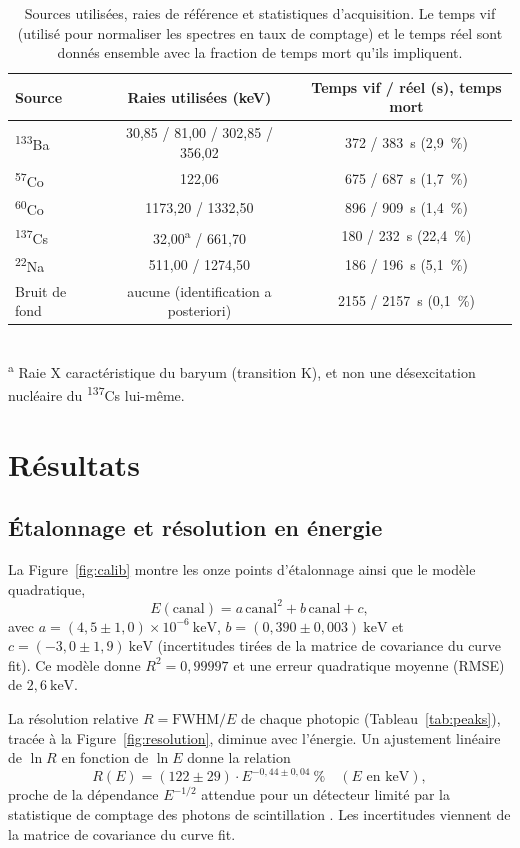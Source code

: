 \documentclass[11pt,letterpaper]{article}
\newcommand{\beq}[1]{\begin{equation} \label{#1}}
\def\enq{\end{equation}}
\begin{document}
\begin{table}[htbp]
\centering
\caption{Sources utilisées, raies de référence et statistiques d'acquisition. Le temps vif (utilisé pour normaliser les spectres en taux de comptage) et le temps réel sont donnés ensemble avec la fraction de temps mort qu'ils impliquent.}
\label{tab:acquisitions}
\small
\begin{tabular}{lcc}
\hline
Source & Raies utilisées (keV) & Temps vif / réel (s), temps mort \\
\hline
\textsuperscript{133}Ba & 30,85 / 81,00 / 302,85 / 356,02 & 372 / 383~s (2,9~\%) \\
\textsuperscript{57}Co  & 122,06 & 675 / 687~s (1,7~\%) \\
\textsuperscript{60}Co  & 1173,20 / 1332,50 & 896 / 909~s (1,4~\%) \\
\textsuperscript{137}Cs & 32,00\textsuperscript{a} / 661,70 & 180 / 232~s (22,4~\%) \\
\textsuperscript{22}Na  & 511,00 / 1274,50 & 186 / 196~s (5,1~\%) \\
Bruit de fond & aucune (identification a posteriori) & 2155 / 2157~s (0,1~\%) \\
\hline
\end{tabular}
\\[0.3em]
{\footnotesize \textsuperscript{a} Raie X caractéristique du baryum (transition K), et non une désexcitation nucléaire du \textsuperscript{137}Cs lui-même.}
\end{table}

\section{Résultats}
\label{sec:resultats}

\subsection{Étalonnage et résolution en énergie}

La Figure~\ref{fig:calib} montre les onze points d'étalonnage ainsi que le modèle quadratique,
\beq{eq:calib}
    E(\text{canal}) = a\,\text{canal}^2 + b\,\text{canal} + c ,
\enq
avec $a = (4{,}5 \pm 1{,}0) \times 10^{-6}~\text{keV}$, $b = (0{,}390 \pm 0{,}003)~\text{keV}$ et $c = (-3{,}0 \pm 1{,}9)~\text{keV}$ (incertitudes tirées de la matrice de covariance du curve fit). Ce modèle donne $R^2 = 0{,}99997$ et une erreur quadratique moyenne (RMSE) de $2{,}6~\text{keV}$.

La résolution relative $R = \text{FWHM}/E$ de chaque photopic (Tableau~\ref{tab:peaks}), tracée à la Figure~\ref{fig:resolution}, diminue avec l'énergie. Un ajustement linéaire de $\ln R$ en fonction de $\ln E$ donne la relation
\beq{eq:resolution}
    R(E) = (122 \pm 29) \cdot E^{-0{,}44 \pm 0{,}04}~\% \quad (E \text{ en keV}) ,
\enq
proche de la dépendance $E^{-1/2}$ attendue pour un détecteur limité par la statistique de comptage des photons de scintillation \cite{knoll}. Les incertitudes viennent de la matrice de covariance du curve fit.
\end{document}
